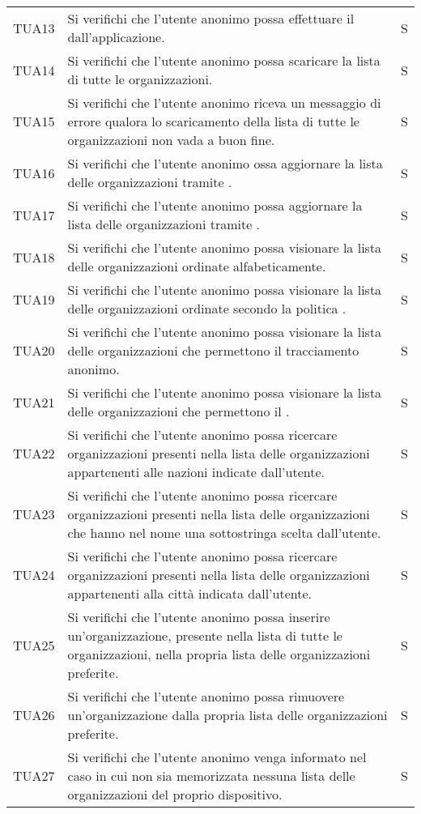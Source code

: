 {\begin{longtable}{ c C{13cm} C{1cm}}
TUA13 & Si verifichi che l'utente anonimo possa effettuare il  dall'applicazione. & S \\
TUA14 & Si verifichi che l'utente anonimo possa scaricare la lista di tutte le organizzazioni. & S \\
TUA15 & Si verifichi che l'utente anonimo riceva un messaggio di errore qualora lo scaricamento della lista di tutte le organizzazioni non vada a buon fine. & S \\
TUA16 & Si verifichi che l'utente anonimo ossa aggiornare la lista delle organizzazioni tramite . & S \\
TUA17 & Si verifichi che l'utente anonimo possa aggiornare la lista delle organizzazioni tramite . & S \\
TUA18 & Si verifichi che l'utente anonimo possa visionare la lista delle organizzazioni ordinate alfabeticamente. & S \\
TUA19 & Si verifichi che l'utente anonimo possa visionare la lista delle organizzazioni ordinate secondo la politica . & S \\
TUA20 & Si verifichi che l'utente anonimo possa visionare la lista delle organizzazioni che permettono il tracciamento anonimo. & S \\
TUA21 & Si verifichi che l'utente anonimo possa visionare la lista delle organizzazioni che permettono il . & S \\
TUA22 & Si verifichi che l'utente anonimo possa ricercare organizzazioni presenti nella lista delle organizzazioni appartenenti alle nazioni indicate dall'utente. & S \\
TUA23 & Si verifichi che l'utente anonimo possa ricercare organizzazioni presenti nella lista delle organizzazioni che hanno nel nome una sottostringa scelta dall'utente. & S \\
TUA24 & Si verifichi che l'utente anonimo possa ricercare organizzazioni presenti nella lista delle organizzazioni appartenenti alla città indicata dall'utente. & S \\
TUA25 & Si verifichi che l'utente anonimo possa inserire un'organizzazione, presente nella lista di tutte le organizzazioni, nella propria lista delle organizzazioni preferite. & S \\
TUA26 & Si verifichi che l'utente anonimo possa rimuovere un'organizzazione dalla propria lista delle organizzazioni preferite. & S \\
TUA27 & Si verifichi che l'utente anonimo venga informato nel caso in cui non sia memorizzata nessuna lista delle organizzazioni del proprio dispositivo. & S \\

\end{longtable}}
